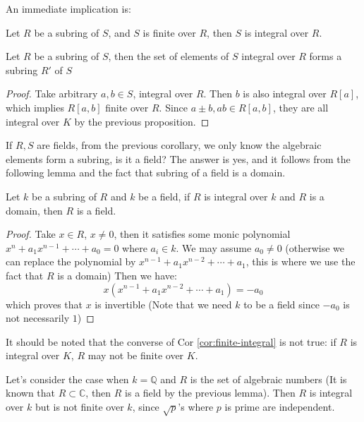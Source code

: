 \documentclass{note-eng}
\begin{document}
An immediate implication is:

\begin{corollary}\label{cor:finite-integral}
    Let $R$ be a subring of $S$, and $S$ is finite over $R$, then $S$ is integral over $R$.
\end{corollary}

\begin{corollary}  \label{cor:integral-subring}
    Let $R$ be a subring of $S$, then the set of elements of $S$ integral over $R$ forms a subring $R'$ of $S$
\end{corollary}

\begin{proof}
    Take arbitrary $a, b \in S$, integral over $R$. Then $b$ is also integral over $R[a]$, which implies $R[a, b]$ finite over $R$. Since $a \pm b, ab \in R[a, b]$, they are all integral over $K$ by the previous proposition.
\end{proof}

If $R, S$ are fields, from the previous corollary, we only know the algebraic elements form a subring, is it a field? The answer is yes, and it follows from the following lemma and the fact that subring of a field is a domain.

\begin{lemma}[Integral Extension of Fields + Domain = Field]\label{lem:integral-domain-field}
    Let $k$ be a subring of $R$ and $k$ be a field, if $R$ is integral over $k$ and $R$ is a domain, then $R$ is a field.
\end{lemma}

\begin{proof}
    Take $x \in R$, $x \ne 0$, then it satisfies some monic polynomial $x^n + a_1x^{n - 1} + \cdots + a_0 = 0$ where $a_i \in k$. We may assume $a_0 \ne 0$ (otherwise we can replace the polynomial by $x^{n - 1} + a_1 x^{n - 2} + \cdots + a_1$, this is where we use the fact that $R$ is a domain) Then we have:
    $$x(x^{n - 1} + a_1 x^{n - 2} + \cdots + a_1) = -a_0$$
    which proves that $x$ is invertible (Note that we need $k$ to be a field since $-a_0$ is not necessarily $1$)
\end{proof}

It should be noted that the converse of Cor \ref{cor:finite-integral} is not true: if $R$ is integral over $K$, $R$ may not be finite over $K$.

\begin{example}  \label{exp:integral-not-finite}
    Let's consider the case when $k = \mathbb{Q}$ and $R$ is the set of algebraic numbers (It is known that $R \subset \mathbb{C}$, then $R$ is a field by the previous lemma). Then $R$ is integral over $k$ but is not finite over $k$, since $\sqrt{p}$'s where $p$ is prime are independent.
\end{example}
\end{document}

